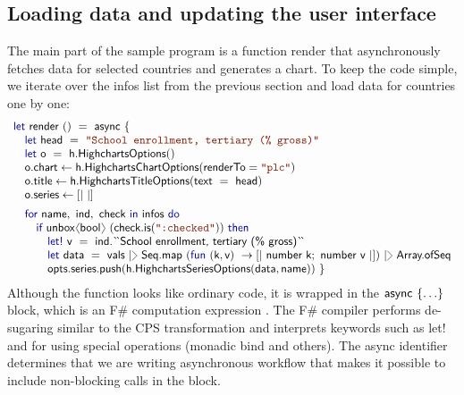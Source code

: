 \documentclass[submission,copyright,creativecommons]{eptcs}
\newcommand{\langl}{\begin{picture}(4.5,7)
\put(1.1,2.5){\rotatebox{60}{\line(1,0){5.5}}}
\put(1.1,2.5){\rotatebox{300}{\line(1,0){5.5}}}
\end{picture}}
\newcommand{\rangl}{\begin{picture}(4.5,7)
\put(.9,2.5){\rotatebox{120}{\line(1,0){5.5}}}
\put(.9,2.5){\rotatebox{240}{\line(1,0){5.5}}}
\end{picture}}
\newcommand{\rang}{\begin{picture}(5,7)
\put(.1,2.5){\rotatebox{135}{\line(1,0){6.0}}}
\put(.1,2.5){\rotatebox{225}{\line(1,0){6.0}}}
\end{picture}}
\newcommand{\kvd}[1]{\textnormal{\textcolor{kvdclr}{\sffamily #1}}}
\newcommand{\str}[1]{\textnormal{\textcolor{strclr}{\ttfamily "#1"}}}
\newcommand{\ident}[1]{\textnormal{\sffamily #1}}
\newcommand{\lident}[1]{\textnormal{\sffamily
  \`{}\hspace{-0.25em}\`{}\hspace{-0.1em}#1\`{}\hspace{-0.25em}\`{}}}
\begin{document}

\subsection{Loading data and updating the user interface}
\label{sec:case-loading}

The main part of the sample program is a function \ident{render} that asynchronously fetches
data for selected countries and generates a chart. To keep the code simple, we iterate over the
\ident{infos} list from the previous section and load data for countries one by one:
%
\begin{equation*}
\begin{array}{lll}
 \kvd{let}~\ident{render}~()~=~\ident{async}~\{ \\
 \quad \kvd{let}~\ident{head}~=~\str{School enrollment, tertiary (\% gross)} \\
 \quad \kvd{let}~\ident{o}~=~\ident{h.HighchartsOptions}() \\
 \quad \ident{o.chart} \leftarrow \ident{h.HighchartsChartOptions}(\ident{renderTo}=\str{plc}) \\
 \quad \ident{o.title} \leftarrow \ident{h.HighchartsTitleOptions}(\ident{text}~=~\ident{head}) \\
 \quad \ident{o.series} \leftarrow \lbrack| ~ |\rbrack
 \\[0.5em]
 \quad \kvd{for}~\ident{name},~\ident{ind},~\ident{check}~\kvd{in}~\ident{infos}~\kvd{do}\\
 \qquad   \kvd{if}~\ident{unbox}\langl \ident{bool} \rangl~(\ident{check.is}(\str{:checked}))~\kvd{then} \\
 \qquad\quad     \kvd{let!}~\ident{v}~=~\ident{ind.}\lident{School enrollment, tertiary (\% gross)} \\
 \qquad\quad     \kvd{let}~\ident{data}~=~\ident{vals}~
                   |\rang~\ident{Seq.map}~(\kvd{fun}~(\ident{k}, \ident{v})~\rightarrow \lbrack|~\ident{number~k};~\ident{number~v} ~|\rbrack)~
                   |\rang~\ident{Array.ofSeq} \\
 \qquad\quad     \ident{opts.series.push}(\ident{h.HighchartsSeriesOptions}(\ident{data}, \ident{name})) ~\}
\end{array}
\end{equation*}
%
Although the function looks like ordinary code, it is wrapped in the $\ident{async}~\{\ldots\}$
block, which is an F\# computation expression \cite{fsharp-zoo}. The F\# compiler performs
de-sugaring similar to the CPS transformation and interprets keywords such as \kvd{let!} and
\kvd{for} using special operations (monadic bind and others). The \ident{async} identifier
determines that we are writing asynchronous workflow \cite{fsharp-async} that makes it
possible to include non-blocking calls in the block.
\end{document}
